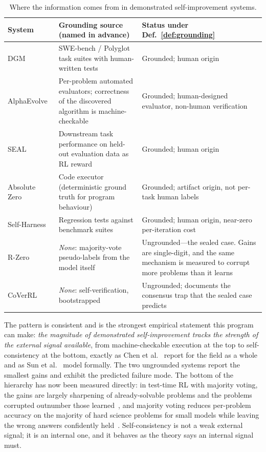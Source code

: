 \documentclass[11pt,a4paper]{article}
\newcommand{\toprule}{\hline}
\newcommand{\midrule}{\hline}
\newcommand{\bottomrule}{\hline}
\begin{document}
\begin{table}[h]
\centering
\small
\begin{tabular}{@{}p{3.2cm}p{5.4cm}p{5.5cm}@{}}
\toprule
\textbf{System} & \textbf{Grounding source (named in advance)} & \textbf{Status under Def.~\ref{def:grounding}} \\
\midrule
DGM~\cite{zhang2025dgm} & SWE-bench / Polyglot task suites with human-written tests & Grounded; human origin \\
AlphaEvolve~\cite{novikov2025alphaevolve} & Per-problem automated evaluators; correctness of the discovered algorithm is machine-checkable & Grounded; human-designed evaluator, non-human verification \\
SEAL~\cite{zweiger2025seal} & Downstream task performance on held-out evaluation data as RL reward & Grounded; human origin \\
Absolute Zero~\cite{zhao2025azr} & Code executor (deterministic ground truth for program behaviour) & Grounded; artifact origin, not per-task human labels \\
Self-Harness~\cite{zhang2026selfharness} & Regression tests against benchmark suites & Grounded; human origin, near-zero per-iteration cost \\
R-Zero~\cite{huang2025rzero} & \emph{None}: majority-vote pseudo-labels from the model itself & Ungrounded---the sealed case. Gains are single-digit, and the same mechanism is measured to corrupt more problems than it learns~\cite{lin2026ttrl,bahuguna2026selfconsistency} \\
CoVerRL~\cite{pan2026coverrl} & \emph{None}: self-verification, bootstrapped & Ungrounded; documents the consensus trap that the sealed case predicts \\
\bottomrule
\end{tabular}
\caption{Where the information comes from in demonstrated self-improvement systems.}
\label{tab:audit}
\end{table}

The pattern is consistent and is the strongest empirical statement this program can make: \emph{the magnitude of demonstrated self-improvement tracks the strength of the external signal available}, from machine-checkable execution at the top to self-consistency at the bottom, exactly as Chen et al.~\cite{chen2026rsi} report for the field as a whole and as Sun et al.~\cite{sun2025solververifier} model formally. The two ungrounded systems report the smallest gains and exhibit the predicted failure mode. The bottom of the hierarchy has now been measured directly: in test-time RL with majority voting, the gains are largely sharpening of already-solvable problems and the problems corrupted outnumber those learned~\cite{lin2026ttrl}, and majority voting reduces per-problem accuracy on the majority of hard science problems for small models while leaving the wrong answers confidently held~\cite{bahuguna2026selfconsistency}. Self-consistency is not a weak external signal; it is an internal one, and it behaves as the theory says an internal signal must.
\end{document}
